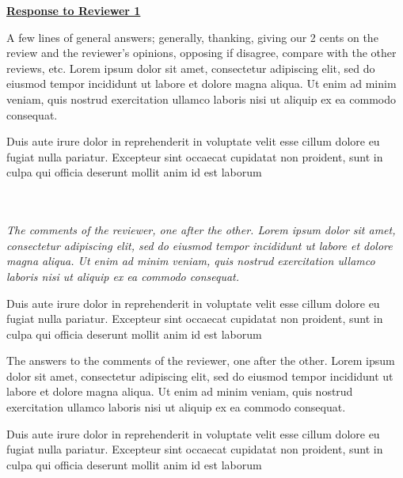 \documentclass[11pt]{article}
\newenvironment{RC}{\itshape}{\par\noindent}
\newenvironment{AC}{\normalfont\color{Blue}}{\par\vspace{0.25cm}}
\begin{document}
\begin{center}
\Large
\textbf{\underline{Response to Reviewer 1}}
\end{center}

  A few lines of general answers; generally, thanking, giving our 2 cents on the review and the reviewer's opinions, opposing if disagree, compare with the other reviews, etc. Lorem ipsum dolor sit amet, consectetur adipiscing elit, sed do eiusmod tempor incididunt ut labore et dolore magna aliqua. Ut enim ad minim veniam, quis nostrud exercitation ullamco laboris nisi ut aliquip ex ea commodo consequat. 

  Duis aute irure dolor in reprehenderit in voluptate velit esse cillum dolore eu fugiat nulla pariatur. Excepteur sint occaecat cupidatat non proident, sunt in culpa qui officia deserunt mollit anim id est laborum

~\\~\\

\begin{RC}
  The comments of the reviewer, one after the other. Lorem ipsum dolor sit amet, consectetur adipiscing elit, sed do eiusmod tempor incididunt ut labore et dolore magna aliqua. Ut enim ad minim veniam, quis nostrud exercitation ullamco laboris nisi ut aliquip ex ea commodo consequat.
  
  Duis aute irure dolor in reprehenderit in voluptate velit esse cillum dolore eu fugiat nulla pariatur. Excepteur sint occaecat cupidatat non proident, sunt in culpa qui officia deserunt mollit anim id est laborum
\end{RC}
\begin{AC}
  The answers to the comments of the reviewer, one after the other. Lorem ipsum dolor sit amet, consectetur adipiscing elit, sed do eiusmod tempor incididunt ut labore et dolore magna aliqua. Ut enim ad minim veniam, quis nostrud exercitation ullamco laboris nisi ut aliquip ex ea commodo consequat.
  
  Duis aute irure dolor in reprehenderit in voluptate velit esse cillum dolore eu fugiat nulla pariatur. Excepteur sint occaecat cupidatat non proident, sunt in culpa qui officia deserunt mollit anim id est laborum
\end{AC}
\end{document}
